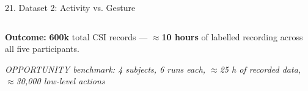 \documentclass[aspectratio=169,11pt]{beamer}
\begin{document}
\begin{frame}{21. Dataset 2: Activity vs. Gesture}
\begin{columns}[T,totalwidth=\textwidth]
\end{columns}

\vfill

\begin{center}

{\scriptsize
\textbf{\color{AmritaMaroon}Outcome:}
\textbf{600k} total CSI records
--- $\approx$\textbf{10 hours} of labelled recording
across all five participants.
}

\vspace{0.04cm}

{\tiny\color{AmritaDark}
\textit{OPPORTUNITY benchmark: 4 subjects, 6 runs each,
$\approx$25 h of recorded data, $\approx$30,000 low-level actions}
}

\vspace{0.04cm}


\end{center}

\end{frame}


\end{document}
